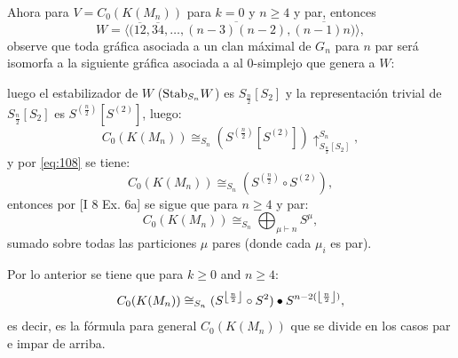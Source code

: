 \documentclass[12pt]{book}
\DeclarePairedDelimiter\floor{\lfloor}{\rfloor}
\theoremstyle{definition}
\newcounter{in}
\begin{document}
  Ahora para $V = C_{0}(K(M_n))$ para $k=0$ y $n \geq 4$ y par, entonces
  $$W = \langle (\overline{12},\overline{34},\ldots,\overline{(n-3)(n-2)}, \overline{(n-1)n)} \rangle,$$
    observe que toda gráfica asociada a un clan máximal de $G_{n}$ para $n$ par será isomorfa a la siguiente gráfica asociada a al $0$-simplejo que genera a $W$:
   \begin{center}
\end{center}
luego el estabilizador de $W$ ($\textup{Stab}_{S_{n}} W$) es $S_{\frac{n}{2}} \left [ S_{2} \right ]$ y la representación trivial de $S_{\frac{n}{2}} \left [ S_{2} \right ]$ es $S^{(\frac{n}{2})} \left [ S^{(2)} \right ]$, luego:
\begin{equation}
C_{0}(K(M_{n})) \cong_{S_{n}} (S^{(\frac{n}{2})} \left [ S^{(2)} \right ])\uparrow_{S_{\frac{n}{2}} \left [ S_{2} \right ]}^{S_{n}},
\end{equation}
y por \ref{eq:108} se tiene:
\begin{equation}
C_{0}(K(M_{n})) \cong_{S_{n}} (S^{(\frac{n}{2})} \circ S^{(2)}),
\end{equation}
entonces por \cite{macdonald1998symmetric} [I 8 Ex. 6a] se sigue que para $n \geq 4$ y par:
\begin{equation}
  \label{eq:97}
   C_{0}(K(M_n)) \cong_{S_{n}} \bigoplus_{\mu \vdash n} S^{\mu},
\end{equation}
sumado sobre todas las particiones $\mu$ pares (donde cada $\mu_{i}$ es par).



Por lo anterior se tiene que para $k \geq 0$ and $n \geq 4$:
\begin{equation}
  \label{eq:113}
  C_{0}(K(M_n)) \cong_{S_{n}} (S^{\floor*{\frac{n}{2}}} \circ S^{2}) \bullet S^{n-2(\floor*{\frac{n}{2}})},
\end{equation}
es decir, es la fórmula para general $C_{0}(K(M_n))$ que se divide en los casos par e impar de arriba.
\end{document}
